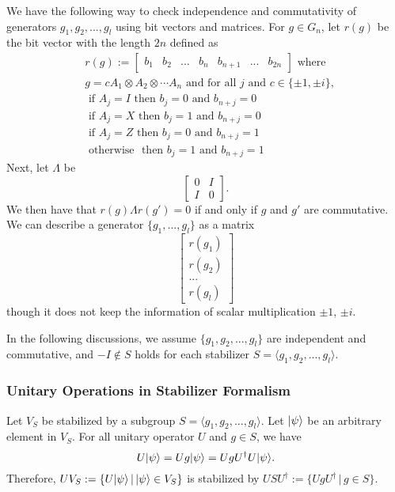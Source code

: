 We have the following way to check independence and commutativity
of generators $g_1, g_2, ..., g_l$ using bit vectors and matrices.
For $g \in G_n$, let $r(g)$ be the bit vector with the length $2n$ defined
as
\begin{align*}
 &r(g) := 
  \begin{bmatrix}
   b_1 & b_2 & ... & b_n & b_{n+1} & ... & b_{2n}
  \end{bmatrix}
 \mbox{ where}\\
 &g = cA_1 \otimes A_2 \otimes \cdots A_n \mbox{ and for all }j 
 \mbox{ and } c \in \{\pm 1, \pm i\},\\
 &\mbox{ if } A_j = I \mbox{ then } b_j = 0 \mbox{ and } b_{n+j} = 0\\
 &\mbox{ if } A_j = X \mbox{ then } b_j = 1 \mbox{ and } b_{n+j} = 0\\
 &\mbox{ if } A_j = Z \mbox{ then } b_j = 0 \mbox{ and } b_{n+j} = 1\\
 &\mbox{ otherwise } \mbox{ then } b_j = 1 \mbox{ and } b_{n+j} = 1
\end{align*}
Next, let $\Lambda$ be
\[
 \begin{bmatrix}
    0 & I\\
    I & 0
  \end{bmatrix}.
\]
We then have that
$r(g) \Lambda r(g') = 0$ if and only if $g$ and $g'$ are commutative.
We can describe a generator $\{g_1,...,g_l\}$ as a matrix
\[
 \begin{bmatrix}
  r(g_1)\\
  r(g_2)\\
  ... \\
  r(g_l)
 \end{bmatrix}
\]
though it does not keep the information of
scalar multiplication $\pm 1$, $\pm i$.

In the following discussions, we assume 
$\{g_1, g_2,...,g_l\}$ are independent and commutative, and
$-I \notin S$ holds for each
stabilizer $S = \langle g_1, g_2,...,g_l \rangle$. 

\subsubsection{Unitary Operations in Stabilizer Formalism}
Let $V_S$ be stabilized by a subgroup $S = 
\langle g_1, g_2,...,g_l \rangle$. Let $|\psi\rangle$ be an 
arbitrary element in $V_S$. For all unitary operator $U$ and $g \in S$,
we have 
\[
 U|\psi\rangle = Ug|\psi\rangle = UgU^\dagger U|\psi\rangle.
\]
Therefore, $UV_S := \{U|\psi\rangle\,|\,|\psi\rangle \in V_S\}$ is
stabilized by $USU^\dagger := \{UgU^\dagger \,|\, g \in S \}$.

